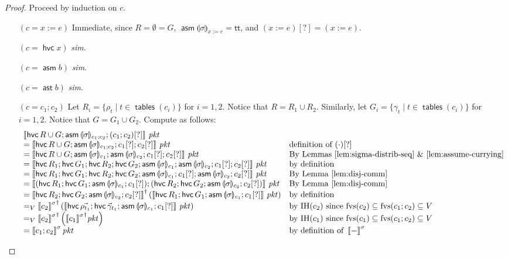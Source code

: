 \documentclass{article}
\newcommand{\pkt}{\mathit{pkt}}
\newcommand{\denote}[1]{\left\llbracket#1\right\rrbracket}
\newcommand{\TRUE}{\mathsf{tt}}
\newcommand{\assert}{\mathop{\mathsf{ast}}}
\newcommand{\assume}{\mathop{\mathsf{asm}}}
\newcommand{\havoc}[1]{\mathop{\mathsf{hvc}}#1}
\newcommand{\state}[1]{\llparenthesis#1\rrparenthesis}
\newcommand{\instr}{[?]}
\newcommand{\fvs}{\textrm{fvs}}
\newcommand{\tables}{\mathop{\mathsf{tables}}}
\begin{document}
\begin{proof}
  Proceed by induction on $c$.
  \begin{enumerate}[align=left]
  \item[$(c = x:=e)$] Immediate, since $R = \emptyset = G$, $\assume{\state\sigma}_{x:=e} = \TRUE$, and $(x:=e)\instr = (x:=e)$.
  \item[$(c = \havoc x)$] \textit{sim}.
  \item[$(c = \assume b)$] \textit{sim}.
  \item[$(c = \assert b)$] \textit{sim}.
  \item[$(c = c_1;c_2)$] Let $R_i = \{\rho_t \mid t \in \tables(c_i)\}$ for $i =
    1,2$. Notice that $R = R_1 \cup R_2$. Similarly, let $G_i = \{\gamma_t \mid
    t \in \tables(c_i)\}$ for $i = 1,2$. Notice that $G = G_1 \cup G_2$. Compute
    as follows:
    \[\begin{array}{ll}
    \denote{\havoc {R \cup G}; \assume{\state\sigma_{c_1;c_2}};(c_1;c_2)\instr}\,\pkt
    & \\
    = \denote{\havoc{R\cup G}; \assume{\state\sigma_{c_1;c_2}}; c_1\instr;c_2\instr}\,\pkt
    & \text{definition of }(\cdot)\instr \\
    = \denote{\havoc{R\cup G}; \assume{\state\sigma_{c_1}};\assume{\state\sigma_{c_2}};c_1\instr;c_2\instr}\,\pkt
    & \text{By Lemmas~\ref{lem:sigma-distrib-seq} \&~\ref{lem:assume-currying}} \\
    = \denote{\havoc{R_1};\havoc{G_1}; \havoc{R_2};\havoc{G_2}; \assume{\state\sigma_{c_1}};\assume{\state\sigma_{c_2}};c_1\instr;c_2\instr}\,\pkt
    & \text{by definition} \\
    = \denote{\havoc{R_1};\havoc{G_1}; \havoc{R_2}; \havoc{G_2}; \assume{\state\sigma_{c_1}};c_1\instr;\assume{\state\sigma_{c_2}};c_2\instr}\,\pkt
    & \text{By Lemma~\ref{lem:disj-comm}} \\
    = \denote{(\havoc{R_1}; \havoc{G_1}; \assume{\state\sigma_{c_1}};c_1\instr);
      (\havoc{R_2}; \havoc{G_2};\assume{\state\sigma_{c_2}};c_2\instr)}\,\pkt
    & \text{By Lemma~\ref{lem:disj-comm}}\\
    = \denote{\havoc{R_2}; \havoc{G_2};\assume{\state\sigma_{c_2}};c_2\instr}^\dagger
    \left(\denote{\havoc{R_1}; \havoc{G_1}; \assume{\state\sigma_{c_1}};c_1\instr}\,\pkt\right)
    & \text{by definition} \\
    =_V {\denote{c_2}^\sigma}^\dagger \left(\denote{\havoc{\vec{\rho_{t_1}}}; \havoc{\vec\gamma_{t_1}}; \assume{\state\sigma_{c_1}};c_1\instr}\,\pkt\right)
    & \text{by IH}(c_2) \text{ since } \fvs(c_2) \subseteq \fvs(c_1;c_2) \subseteq V \\
    =_V {\denote{c_2}^\sigma}^\dagger \left({\denote{c_1}^\sigma}^\dagger\pkt\right)
    & \text{by IH}(c_1) \text{ since } \fvs(c_1) \subseteq \fvs(c_1;c_2) \subseteq V \\
    = \denote{c_1;c_2}^\sigma\pkt
    & \text{by definition of }\denote{-}^\sigma\\
    \end{array}\]


\end{enumerate}
\end{proof}
\end{document}
